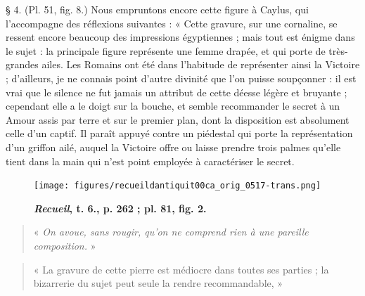 \documentclass[a4paper, 11pt, oneside, polutonikogreek, french]{article}
\begin{document}
§ 4. (Pl. 51, fig. 8.) Nous empruntons encore cette figure à Caylus, qui l'accompagne des réflexions suivantes : « Cette gravure, sur une cornaline, se ressent encore beaucoup des impressions égyptiennes ; mais tout est énigme dans le sujet : la principale figure représente une femme drapée, et qui porte de très-grandes ailes. Les Romains ont été dans l'habitude de représenter ainsi la Victoire ; d'ailleurs, je ne connais point d'autre divinité que l'on puisse soupçonner : il est vrai que le silence ne fut jamais un attribut de cette déesse légère et bruyante ; cependant elle a le doigt sur la bouche, et semble recommander le secret à un Amour assis par terre et sur le premier plan, dont la disposition est absolument celle d'un captif. Il paraît appuyé contre un piédestal qui porte la représentation d'un griffon ailé, auquel la Victoire offre ou laisse prendre trois palmes qu'elle tient dans la main qui n'est point employée à caractériser le secret.

\begin{figure}[H]
\centering
\texttt{[image: figures/recueildantiquit00ca\_orig\_0517-trans.png]}
\caption{\bfseries \emph{Recueil}, t. 6., p. 262 ; pl. 81, fig. 2.}
\end{figure}
\begin{quotation}
\small
« \emph{On avoue, sans rougir, qu'on ne comprend rien à une pareille composition.} »

\end{quotation}
\begin{quotation}
\small
« La gravure de cette pierre est médiocre dans toutes ses parties ; la bizarrerie du sujet peut seule la rendre recommandable, »

\end{quotation}
\end{document}
